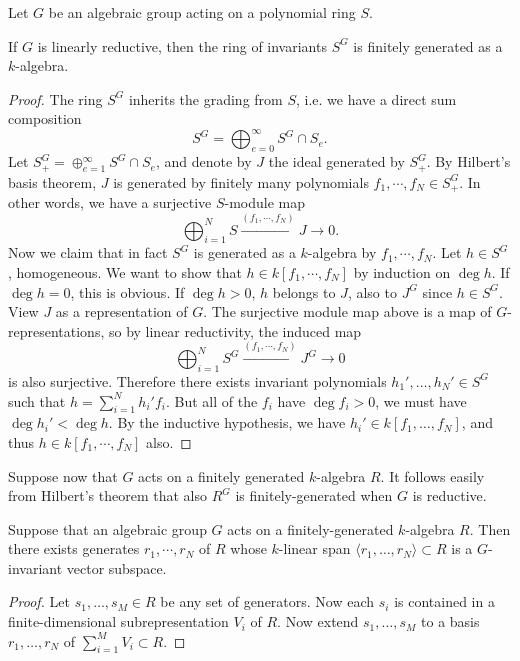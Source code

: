 \documentclass[11pt, english]{article}
\begin{document}
Let $G$ be an algebraic group acting on a polynomial ring $S$.

\begin{thm}[Hilbert]
If $G$ is linearly reductive, then the ring of invariants $S^G$ is finitely generated as a $k$-algebra.
\end{thm}
\begin{proof}
The ring $S^G$ inherits the grading from $S$, i.e. we have a direct sum composition
$$
S^G = \bigoplus_{e=0}^\infty S^G \cap S_e.
$$
Let $S_+^G = \oplus_{e=1}^\infty S^G \cap S_e$, and denote by $J$ the ideal generated by $S_+^G$. By Hilbert's basis theorem, $J$ is generated by finitely many polynomials $f_1,\cdots,f_N \in S_+^G$. In other words, we have a surjective $S$-module map
$$
\bigoplus_{i=1}^N S \xrightarrow{(f_1,\cdots,f_N)} J \to 0.
$$
Now we claim that in fact $S^G$ is generated as a $k$-algebra by $f_1,\cdots,f_N$. Let $h \in S^G$, homogeneous. We want to show that $h \in k[f_1,\cdots,f_N]$ by induction on $\deg h$. If $\deg h = 0$, this is obvious. If $\deg h> 0$, $h$ belongs to $J$, also to $J^G$ since $h \in S^G$. View $J$ as a representation of $G$. The surjective module map above is a map of $G$-representations, so by linear reductivity, the induced map
$$
\bigoplus_{i=1}^N S^G \xrightarrow{(f_1,\cdots,f_N)} J^G \to 0
$$
is also surjective. Therefore there exists invariant polynomials $h_1',\ldots,h_N' \in S^G$ such that $h= \sum_{i=1}^N h_i' f_i$. But all of the $f_i$ have $\deg f_i > 0$, we must have $\deg h_i' < \deg h$. By the inductive hypothesis, we have $h_i' \in k[f_1,\ldots,f_N]$, and thus $h \in k[f_1,\cdots,f_N]$ also.
\end{proof}
 
Suppose now that $G$ acts on a finitely generated $k$-algebra $R$. It follows easily from Hilbert's theorem that also $R^G$ is finitely-generated when $G$ is reductive.

\begin{lemma}
 Suppose that an algebraic group $G$ acts on a finitely-generated $k$-algebra $R$. Then there exists generates $r_1,\cdots,r_N$ of $R$ whose $k$-linear span $\langle r_1,\ldots, r_N \rangle \subset R$ is a $G$-invariant vector subspace.
\end{lemma}
\begin{proof}
Let $s_1,\ldots,s_M \in R$ be any set of generators. Now each $s_i$ is contained in a finite-dimensional subrepresentation $V_i$ of $R$. Now extend $s_1,\ldots, s_M$ to a basis $r_1,\ldots, r_N$ of $\sum_{i=1}^M V_i \subset R$.
\end{proof}
\end{document}
